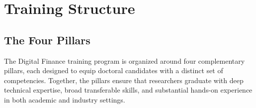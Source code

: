 \chapter{Training Structure}
\label{ch:training-overview}

\section{The Four Pillars}
\label{sec:four-pillars}

The Digital Finance training program is organized around four complementary
pillars, each designed to equip doctoral candidates with a distinct set of
competencies.  Together, the pillars ensure that researchers graduate with
deep technical expertise, broad transferable skills, and substantial hands-on
experience in both academic and industry settings.

\vspace{6pt}

